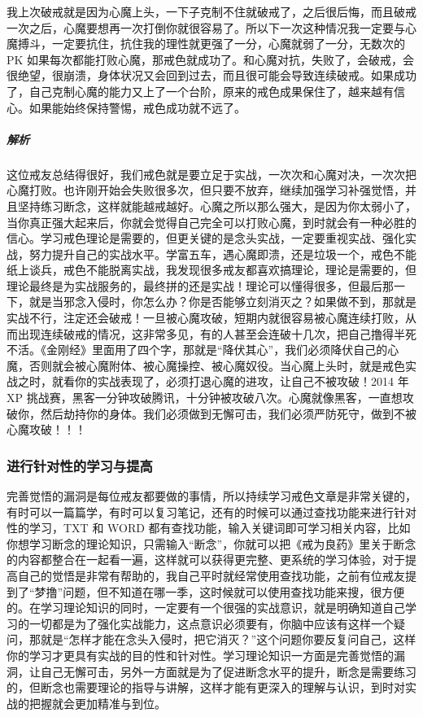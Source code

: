 \begin{case}
    我上次破戒就是因为心魔上头，一下子克制不住就破戒了，之后很后悔，而且破戒一次之后，心魔要想再一次打倒你就很容易了。所以下一次这种情况我一定要与心魔搏斗，一定要抗住，抗住我的理性就更强了一分，心魔就弱了一分，无数次的 PK 如果每次都能打败心魔，那戒色就成功了。和心魔对抗，失败了，会破戒，会很绝望，很崩溃，身体状况又会回到过去，而且很可能会导致连续破戒。如果成功了，自己克制心魔的能力又上了一个台阶，原来的戒色成果保住了，越来越有信心。如果能始终保持警惕，戒色成功就不远了。
    \subparagraph{解析} 这位戒友总结得很好，我们戒色就是要立足于实战，一次次和心魔对决，一次次把心魔打败。也许刚开始会失败很多次，但只要不放弃，继续加强学习补强觉悟，并且坚持练习断念，这样就能越戒越好。心魔之所以那么强大，是因为你太弱小了，当你真正强大起来后，你就会觉得自己完全可以打败心魔，到时就会有一种必胜的信心。学习戒色理论是需要的，但更关键的是念头实战，一定要重视实战、强化实战，努力提升自己的实战水平。学富五车，遇心魔即溃，还是垃圾一个，戒色不能纸上谈兵，戒色不能脱离实战，我发现很多戒友都喜欢搞理论，理论是需要的，但理论最终是为实战服务的，最终拼的还是实战！理论可以懂得很多，但最后那一下，就是当邪念入侵时，你怎么办？你是否能够立刻消灭之？如果做不到，那就是实战不行，注定还会破戒！一旦被心魔攻破，短期内就很容易被心魔连续打败，从而出现连续破戒的情况，这非常多见，有的人甚至会连破十几次，把自己撸得半死不活。《金刚经》里面用了四个字，那就是“降伏其心”，我们必须降伏自己的心魔，否则就会被心魔附体、被心魔操控、被心魔奴役。当心魔上头时，就是戒色实战之时，就看你的实战表现了，必须打退心魔的进攻，让自己不被攻破！2014 年 XP 挑战赛，黑客一分钟攻破腾讯，十分钟被攻破八次。心魔就像黑客，一直想攻破你，然后劫持你的身体。我们必须做到无懈可击，我们必须严防死守，做到不被心魔攻破！！！
\end{case}

\subsubsection{进行针对性的学习与提高}

完善觉悟的漏洞是每位戒友都要做的事情，所以持续学习戒色文章是非常关键的，有时可以一篇篇学，有时可以复习笔记，还有的时候可以通过查找功能来进行针对性的学习，TXT 和 WORD 都有查找功能，输入关键词即可学习相关内容，比如你想学习断念的理论知识，只需输入“断念”，你就可以把《戒为良药》里关于断念的内容都整合在一起看一遍，这样就可以获得更完整、更系统的学习体验，对于提高自己的觉悟是非常有帮助的，我自己平时就经常使用查找功能，之前有位戒友提到了“梦撸”问题，但不知道在哪一季，这时候就可以使用查找功能来搜，很方便的。在学习理论知识的同时，一定要有一个很强的实战意识，就是明确知道自己学习的一切都是为了强化实战能力，这点意识必须要有，你脑中应该有这样一个疑问，那就是“怎样才能在念头入侵时，把它消灭？”这个问题你要反复问自己，这样你的学习才更具有实战的目的性和针对性。学习理论知识一方面是完善觉悟的漏洞，让自己无懈可击，另外一方面就是为了促进断念水平的提升，断念是需要练习的，但断念也需要理论的指导与讲解，这样才能有更深入的理解与认识，到时对实战的把握就会更加精准与到位。

